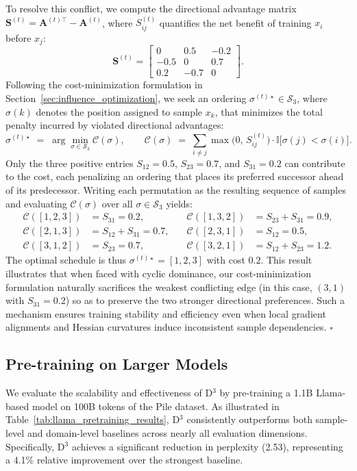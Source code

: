 To resolve this conflict, we compute the directional advantage matrix $\mathbf{S}^{(t)} = \mathbf{A}^{(t)\top} - \mathbf{A}^{(t)}$, where $S^{(t)}_{ij}$ quantifies the net benefit of training $x_i$ before $x_j$:
$$
\mathbf{S}^{(t)} =
\begin{bmatrix}
0 & 0.5 & -0.2 \\
-0.5 & 0 & 0.7 \\
0.2 & -0.7 & 0
\end{bmatrix}.
$$
Following the cost-minimization formulation in Section~\ref{sec:influence_optimization}, we seek an ordering $\sigma^{(t)\star} \in \mathcal{S}_3$, where $\sigma(k)$ denotes the position assigned to sample $x_k$, that minimizes the total penalty incurred by violated directional advantages:
$$
\sigma^{(t)\star} \;=\; \arg\min_{\sigma \in \mathcal{S}_3} \mathcal{C}(\sigma), 
\qquad 
\mathcal{C}(\sigma) \;=\; \sum_{i \ne j} \max\!\bigl(0,\, S^{(t)}_{ij}\bigr) \cdot \mathbb{I}\bigl[\sigma(j) < \sigma(i)\bigr].
$$
Only the three positive entries $S_{12}=0.5$, $S_{23}=0.7$, and $S_{31}=0.2$ can contribute to the cost, each penalizing an ordering that places its preferred successor ahead of its predecessor. Writing each permutation as the resulting sequence of samples and evaluating $\mathcal{C}(\sigma)$ over all $\sigma \in \mathcal{S}_3$ yields:
$$
\begin{aligned}
\mathcal{C}([1,2,3]) &= S_{31} = 0.2, \quad & \mathcal{C}([1,3,2]) &= S_{23} + S_{31} = 0.9, \\
\mathcal{C}([2,1,3]) &= S_{12} + S_{31} = 0.7, \quad & \mathcal{C}([2,3,1]) &= S_{12} = 0.5, \\
\mathcal{C}([3,1,2]) &= S_{23} = 0.7, \quad & \mathcal{C}([3,2,1]) &= S_{12} + S_{23} = 1.2.
\end{aligned}
$$
The optimal schedule is thus $\sigma^{(t)\star} = [1,2,3]$ with cost $0.2$. This result illustrates that when faced with cyclic dominance, our cost-minimization formulation naturally sacrifices the weakest conflicting edge (in this case, $(3,1)$ with $S_{31}=0.2$) so as to preserve the two stronger directional preferences. Such a mechanism ensures training stability and efficiency even when local gradient alignments and Hessian curvatures induce inconsistent sample dependencies.
\hfill $\square$

\subsection{Pre-training on Larger Models}
We evaluate the scalability and effectiveness of D$^3$ by pre-training a 1.1B Llama-based model on 100B tokens of the Pile dataset. 
As illustrated in Table~\ref{tab:llama_pretraining_results}, D$^3$ consistently outperforms both sample-level and domain-level baselines across nearly all evaluation dimensions. Specifically, D$^3$ achieves a significant reduction in perplexity (2.53), representing a 4.1\% relative improvement over the strongest baseline.

